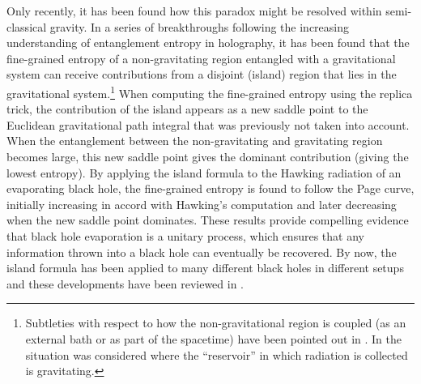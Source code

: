 \documentclass[a4paper,11pt]{article}
\numberwithin{equation}{section}
\begin{document}
Only recently, it has been found how this paradox might be resolved within semi-classical gravity. In a series of breakthroughs \cite{Ryu:2006bv,Hubeny:2007xt,Faulkner:2013ana,Barrella:2013wja,Engelhardt:2014gca,Penington:2019npb,Almheiri:2019psf} following the increasing understanding of entanglement entropy in holography, it has been found that the fine-grained entropy of a non-gravitating region entangled with a gravitational system can receive contributions from a disjoint (island) region that lies in the gravitational system.\footnote{Subtleties with respect to how the non-gravitational region is coupled (as an external bath or as part of the spacetime) have been pointed out in \cite{Laddha:2020kvp}. In \cite{Geng:2020fxl} the situation was considered where the ``reservoir'' in which radiation is collected is gravitating.} When computing the fine-grained entropy using the replica trick, the contribution of the island appears as a new saddle point to the Euclidean gravitational path integral that was previously not taken into account. When the entanglement between the non-gravitating and gravitating region becomes large, this new saddle point gives the dominant contribution (giving the lowest entropy). By applying the island formula to the Hawking radiation of an evaporating black hole, the fine-grained entropy is found to follow the Page curve, initially increasing in accord with Hawking's computation and later decreasing when the new saddle point dominates. These results provide compelling evidence that black hole evaporation is a unitary process, which ensures that any information thrown into a black hole can eventually be recovered. By now, the island formula has been applied to many different black holes in different setups \cite{Almheiri:2019hni,Almheiri:2019yqk,Almheiri:2019psy,Gautason:2020tmk,Anegawa:2020ezn,Hashimoto:2020cas,Hartman:2020swn,Hollowood:2020cou,Dong:2020uxp,Chen:2020tes,Hartman:2020khs,Balasubramanian:2020hfs,Balasubramanian:2020xqf,Balasubramanian:2020coy,Alishahiha:2020qza,Chen:2020jvn,Geng:2020qvw,Chen:2020uac,Chen:2020hmv,Harlow:2020bee,Hernandez:2020nem,Akal:2020twv,Basak:2020aaa,Caceres:2020jcn,Karananas:2020fwx,Wang:2021woy} and these developments have been reviewed in \cite{Almheiri:2020cfm,Marolf:2020rpm,Raju:2020smc}.
\end{document}
